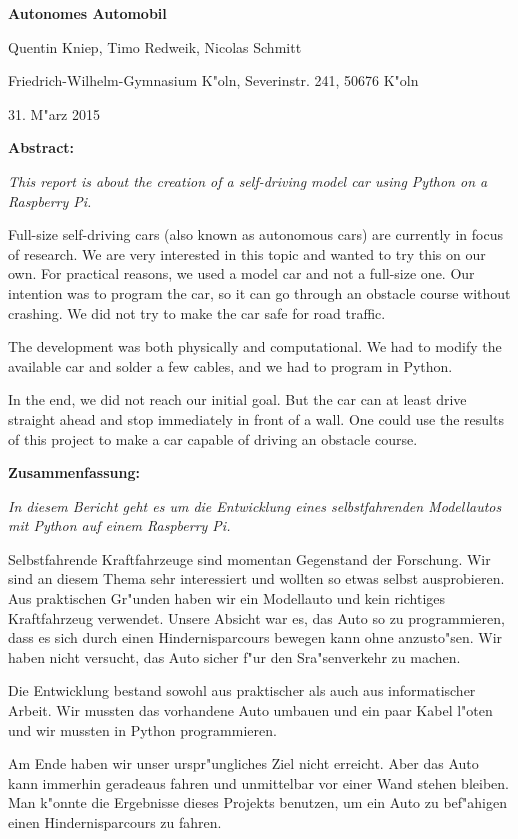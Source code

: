 \documentclass[a4paper,12pt]{article}
\begin{document}
{\Large\bf Autonomes Automobil}

\medskip

Quentin Kniep, Timo Redweik, Nicolas Schmitt

\medskip

Friedrich-Wilhelm-Gymnasium K"oln, Severinstr. 241, 50676 K"oln

\medskip

31. M"arz  2015

\medskip

{\bf  Abstract:}

{\small

	{\it This report is about the creation of a self-driving model car using Python on a Raspberry Pi.}
	
	Full-size self-driving cars (also known as autonomous cars) are currently in focus of research.
	We are very interested in this topic and wanted to try this on our own.
	For practical reasons, we used a model car and not a full-size one.
	Our intention was to program the car, so it can go through an obstacle course without crashing.
	We did not try to make the car safe for road traffic.

	The development was both physically and computational.
	We had to modify the available car and solder a few cables, and we had to program in Python.
	
	In the end, we did not reach our initial goal.
	But the car can at least drive straight ahead and stop immediately in front of a wall.
	One could use the results of this project to make a car capable of driving an obstacle 	course.

}

\medskip

{\bf  Zusammenfassung:}

{\small

	{\it In diesem Bericht geht es um die Entwicklung eines selbstfahrenden Modellautos mit Python auf einem Raspberry Pi.}
	
	Selbstfahrende Kraftfahrzeuge sind momentan Gegenstand der Forschung.
	Wir sind an diesem Thema sehr interessiert und wollten so etwas selbst ausprobieren.
	Aus praktischen Gr"unden haben wir ein Modellauto und kein richtiges Kraftfahrzeug verwendet.
	Unsere Absicht war es, das Auto so zu programmieren, dass es sich durch einen Hindernisparcours bewegen kann ohne anzusto"sen.
	Wir haben nicht versucht, das Auto sicher f"ur den Sra"senverkehr zu machen.
	
	Die Entwicklung bestand sowohl aus praktischer als auch aus informatischer Arbeit.
	Wir mussten das vorhandene Auto umbauen und ein paar Kabel l"oten und wir mussten in Python programmieren.
	
	Am Ende haben wir unser urspr"ungliches Ziel nicht erreicht.
	Aber das Auto kann immerhin geradeaus fahren und unmittelbar vor einer Wand stehen bleiben.
	Man k"onnte die Ergebnisse dieses Projekts benutzen, um ein Auto zu bef"ahigen einen Hindernisparcours zu fahren.

}
\end{document}
